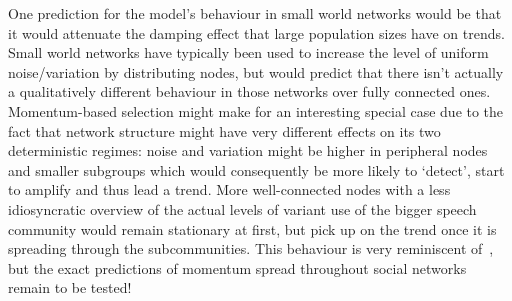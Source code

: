 One prediction for the model's behaviour in small world networks would be that it would attenuate the damping effect that large population sizes have on trends. Small world networks have typically been used to increase the level of uniform noise/variation by distributing nodes, but \cite{Baxter2008} would predict that there isn't actually a qualitatively different behaviour in those networks over fully connected ones. Momentum-based selection might make for an interesting special case due to the fact that network structure might have very different effects on its two deterministic regimes: noise and variation might be higher in peripheral nodes and smaller subgroups which would consequently be more likely to `detect', start to amplify and thus lead a trend. More well-connected nodes with a less idiosyncratic overview of the actual levels of variant use of the bigger speech community would remain stationary at first, but pick up on the trend once it is spreading through the subcommunities. This behaviour is very reminiscent of~\cite{Granovetter1973}, but the exact predictions of momentum spread throughout social networks remain to be tested!





